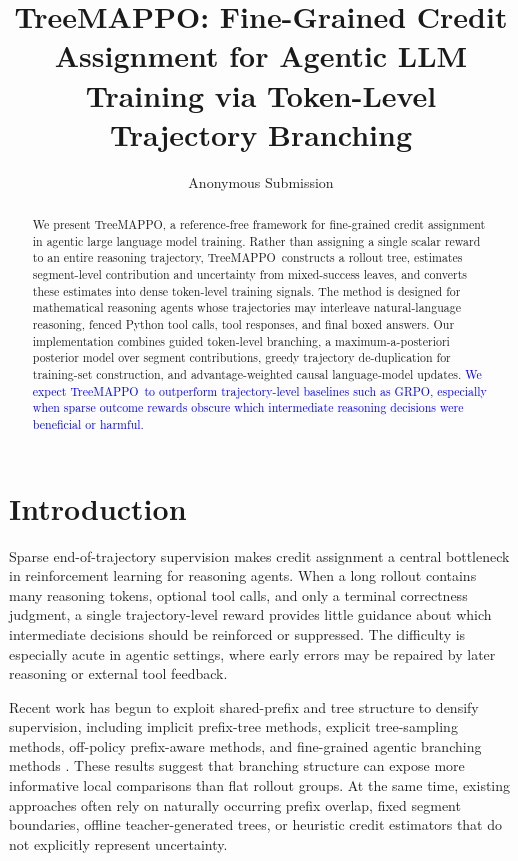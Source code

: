 \documentclass[letterpaper]{article} %
\title{TreeMAPPO: Fine-Grained Credit Assignment for Agentic LLM Training via Token-Level Trajectory Branching}
\author{Anonymous Submission}
\newcommand{\ours}{TreeMAPPO}
\newcommand{\expected}[1]{\textcolor{blue}{#1}}
\begin{document}
\maketitle

\begin{abstract}
We present \ours, a reference-free framework for fine-grained credit assignment in agentic large language model training. Rather than assigning a single scalar reward to an entire reasoning trajectory, \ours\ constructs a rollout tree, estimates segment-level contribution and uncertainty from mixed-success leaves, and converts these estimates into dense token-level training signals. The method is designed for mathematical reasoning agents whose trajectories may interleave natural-language reasoning, fenced Python tool calls, tool responses, and final boxed answers. Our implementation combines guided token-level branching, a maximum-a-posteriori posterior model over segment contributions, greedy trajectory de-duplication for training-set construction, and advantage-weighted causal language-model updates. \expected{We expect \ours\ to outperform trajectory-level baselines such as GRPO, especially when sparse outcome rewards obscure which intermediate reasoning decisions were beneficial or harmful.}
\end{abstract}

\section{Introduction}
Sparse end-of-trajectory supervision makes credit assignment a central bottleneck in reinforcement learning for reasoning agents. When a long rollout contains many reasoning tokens, optional tool calls, and only a terminal correctness judgment, a single trajectory-level reward provides little guidance about which intermediate decisions should be reinforced or suppressed. The difficulty is especially acute in agentic settings, where early errors may be repaired by later reasoning or external tool feedback.

Recent work has begun to exploit shared-prefix and tree structure to densify supervision, including implicit prefix-tree methods, explicit tree-sampling methods, off-policy prefix-aware methods, and fine-grained agentic branching methods \cite{tempo2025,treerpo2025,treepo2025,treeopo2025,appo2026}. These results suggest that branching structure can expose more informative local comparisons than flat rollout groups. At the same time, existing approaches often rely on naturally occurring prefix overlap, fixed segment boundaries, offline teacher-generated trees, or heuristic credit estimators that do not explicitly represent uncertainty.
\end{document}

